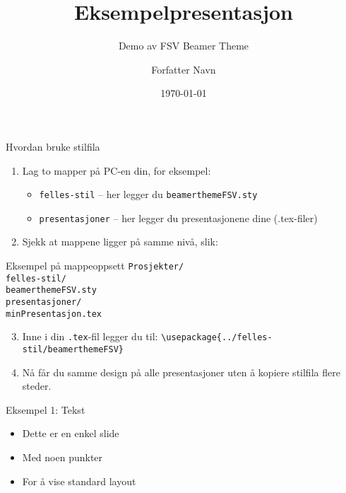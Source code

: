 \documentclass{beamer}
\title{Eksempelpresentasjon}
\subtitle{Demo av FSV Beamer Theme}
\author{Forfatter Navn}
\institute{Fagskolen Viken}
\date{\today}
\begin{document}
	
	\begin{frame}
		\titlepage
	\end{frame}
	\begin{frame}{Hvordan bruke stilfila}
		\begin{enumerate}
			\item Lag to mapper på PC-en din, for eksempel:
			\begin{itemize}
				\item \texttt{felles-stil} – her legger du \texttt{beamerthemeFSV.sty}
				\item \texttt{presentasjoner} – her legger du presentasjonene dine (.tex-filer)
			\end{itemize}
			\item Sjekk at mappene ligger på samme nivå, slik:
		\end{enumerate}
		
		\begin{block}{Eksempel på mappeoppsett}
			\texttt{Prosjekter/} \\
			\quad \texttt{felles-stil/} \\
			\quad\quad \texttt{beamerthemeFSV.sty} \\
			\quad \texttt{presentasjoner/} \\
			\quad\quad \texttt{minPresentasjon.tex}
		\end{block}
		
		\begin{enumerate}
			\setcounter{enumi}{2}
			\item Inne i din \texttt{.tex}-fil legger du til:  
			\texttt{\textbackslash usepackage\{../felles-stil/beamerthemeFSV\}}
			\item Nå får du samme design på alle presentasjoner uten å kopiere stilfila flere steder.
		\end{enumerate}
	\end{frame}
	
	\begin{frame}{Eksempel 1: Tekst}
		\begin{itemize}
			\item Dette er en enkel slide
			\item Med noen punkter
			\item For å vise standard layout
		\end{itemize}
	\end{frame}
	
\end{document}
